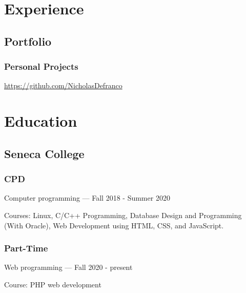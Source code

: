 \documentclass{article}
\begin{document}
\section{Experience}

\subsection{Portfolio}

\subsubsection{Personal Projects}

\url{https://github.com/NicholasDefranco}

\section{Education}

\subsection{Seneca College}

\subsubsection{CPD}

Computer programming --- Fall 2018 - Summer 2020

Courses: Linux, C/C++ Programming, Database Design and Programming
(With Oracle), Web Development using HTML, CSS, and JavaScript.

\subsubsection{Part-Time}

Web programming --- Fall 2020 - present

Course: PHP web development
\end{document}
